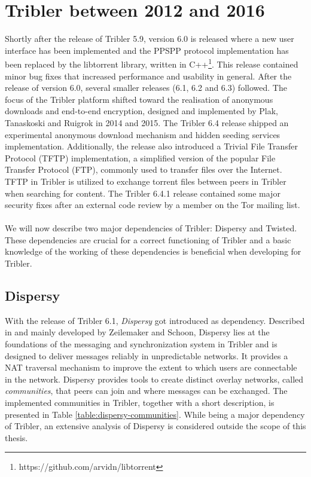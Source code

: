\section{Tribler between 2012 and 2016}
Shortly after the release of Tribler 5.9, version 6.0 is released where a new user interface has been implemented and the PPSPP protocol implementation has been replaced by the libtorrent library, written in C++\footnote{https://github.com/arvidn/libtorrent}. This release contained minor bug fixes that increased performance and usability in general. After the release of version 6.0, several smaller releases (6.1, 6.2 and 6.3) followed. The focus of the Tribler platform shifted toward the realisation of anonymous downloads and end-to-end encryption, designed and implemented by Plak, Tanaskoski and Ruigrok in 2014 and 2015\cite{plak2014anonymous}\cite{tanaskoski2014anonymous}\cite{ruigrok2015bittorrent}. The Tribler 6.4 release shipped an experimental anonymous download mechanism and hidden seeding services implementation. Additionally, the release also introduced a Trivial File Transfer Protocol (TFTP)\cite{sollins1992tftp} implementation, a simplified version of the popular File Transfer Protocol (FTP)\cite{postel1985rfc}, commonly used to transfer files over the Internet. TFTP in Tribler is utilized to exchange torrent files between peers in Tribler when searching for content. The Tribler 6.4.1 release contained some major security fixes after an external code review by a member on the Tor mailing list\cite{githubissue1066}.\\\\
We will now describe two major dependencies of Tribler: Dispersy and Twisted. These dependencies are crucial for a correct functioning of Tribler and a basic knowledge of the working of these dependencies is beneficial when developing for Tribler.

\subsection{Dispersy}
With the release of Tribler 6.1, \emph{Dispersy} got introduced as dependency. Described in \cite{zeilemaker2013dispersy} and mainly developed by Zeilemaker and Schoon, Dispersy lies at the foundations of the messaging and synchronization system in Tribler and is designed to deliver messages reliably in unpredictable networks. It provides a NAT traversal mechanism to improve the extent to which users are connectable in the network. Dispersy provides tools to create distinct overlay networks, called \emph{communities}, that peers can join and where messages can be exchanged. The implemented communities in Tribler, together with a short description, is presented in Table \ref{table:dispersy-communities}. While being a major dependency of Tribler, an extensive analysis of Dispersy is considered outside the scope of this thesis.

